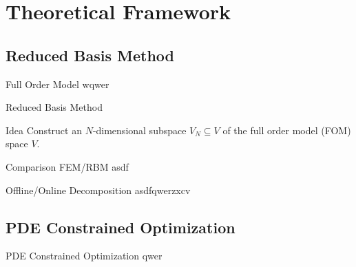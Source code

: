 \section{Theoretical Framework}

\subsection{Reduced Basis Method}

\begin{frame}{Full Order Model}
    wqwer
\end{frame}

\begin{frame}{Reduced Basis Method}
    \begin{block}{Idea}
        Construct an $N$-dimensional subspace $V_N \subseteq V$ of the full order model (FOM) space $V$.
    \end{block}

\end{frame}

\begin{frame}{Comparison FEM/RBM}
    asdf
\end{frame}

\begin{frame}{Offline/Online Decomposition}
    asdfqwerzxcv
\end{frame}

\subsection{PDE Constrained Optimization}

\begin{frame}{PDE Constrained Optimization}
    qwer
\end{frame}

